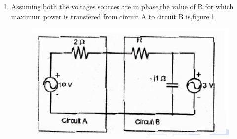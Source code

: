 \documentclass[journal,12pt,twocolumn]{IEEEtran}
\begin{document}
\begin{enumerate}
\item Assuming both the voltages sources are in phase,the value of R for which maximum power is transfered from circuit A to circuit B is,figure.\ref{fig88}
\begin{enumerate}
\begin{figure}[!h]
\begin{center}
\includegraphics[scale=0.7]{./figs/fig88.eps}
\caption{}
\label{fig88}
\end{center}
\end{figure}
\end{enumerate}



\end{enumerate}
\end{document}
